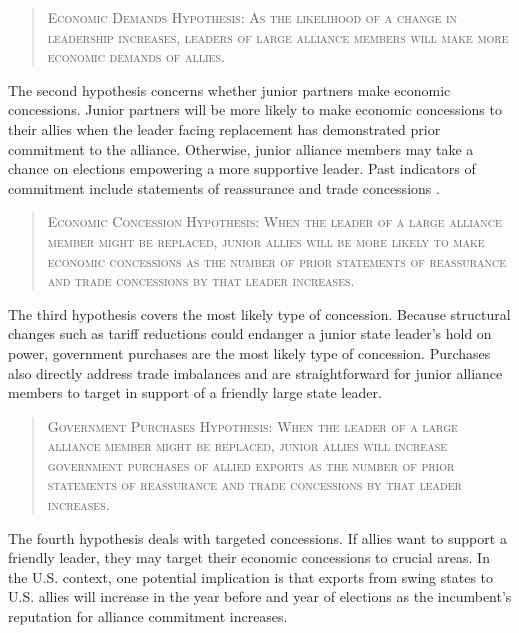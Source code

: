 \documentclass[12pt]{article}
\begin{document}
\begin{quote}
\textsc{Economic Demands Hypothesis: As the likelihood of a change in leadership increases, leaders of large alliance members will make more economic demands of allies.}
\end{quote}


The second hypothesis concerns whether junior partners make economic concessions. 
Junior partners will be more likely to make economic concessions to their allies when the leader facing replacement has demonstrated prior commitment to the alliance. 
Otherwise, junior alliance members may take a chance on elections empowering a more supportive leader. 
Past indicators of commitment include statements of reassurance \citep{Blankenship2020} and trade concessions \citep{WolfordKim2017}.


\begin{quote}
\textsc{Economic Concession Hypothesis: When the leader of a large alliance member might be replaced, junior allies will be more likely to make economic concessions as the number of prior statements of reassurance and trade concessions by that leader increases.}
\end{quote}

The third hypothesis covers the most likely type of concession.
Because structural changes such as tariff reductions could endanger a junior state leader's hold on power, government purchases are the most likely type of concession.
Purchases also directly address trade imbalances and are straightforward for junior alliance members to target in support of a friendly large state leader.

\begin{quote}
\textsc{Government Purchases Hypothesis: When the leader of a large alliance member might be replaced, junior allies will increase government purchases of allied exports as the number of prior statements of reassurance and trade concessions by that leader increases.}
\end{quote}





The fourth hypothesis deals with targeted concessions.
If allies want to support a friendly leader, they may target their economic concessions to crucial areas.
In the U.S. context, one potential implication is that exports from swing states to U.S. allies will increase in the year before and year of elections as the incumbent's reputation for alliance commitment increases.
\end{document}
